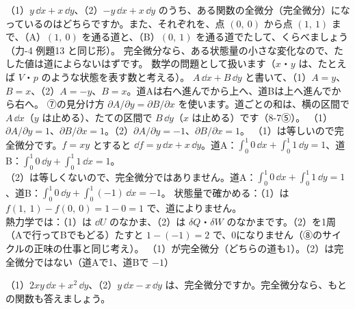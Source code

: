 \label{ph:熱-2:ex11}
\begin{phreidai}[状態量の小さな変化はどちら？]
（1）$y\,\dd x+x\,\dd y$、（2）$-y\,\dd x+x\,\dd y$ のうち、ある関数の全微分（完全微分）になっているのはどちらですか。また、それぞれを、点 $(0,\ 0)$ から点 $(1,\ 1)$ まで、（A）$(1,\ 0)$ を通る道と、（B）$(0,\ 1)$ を通る道でたして、くらべましょう（力-4 例題13 と同じ形）。
\phbamen
完全微分なら、ある状態量の小さな変化なので、たした値は道によらないはずです。
\phmushi
数学の問題として扱います（$x$・$y$ は、たとえば $V$・$p$ のような状態を表す数と考える）。
\phzu
$A\,\dd x+B\,\dd y$ と書いて、（1）$A=y$、$B=x$、（2）$A=-y$、$B=x$。道Aは右へ進んでから上へ、道Bは上へ進んでから右へ。
\phriyu
⑦の見分け方 $\partial A/\partial y=\partial B/\partial x$ を使います。道ごとの和は、横の区間で $A\,\dd x$（$y$ は止める）、たての区間で $B\,\dd y$（$x$ は止める）です（8-7⑤）。
\phtateru
（1）$\partial A/\partial y=1$、$\partial B/\partial x=1$。（2）$\partial A/\partial y=-1$、$\partial B/\partial x=1$。
\phtoku
（1）は等しいので完全微分です。$f=xy$ とすると $\dd f=y\,\dd x+x\,\dd y$。道A：$\int_0^1 0\,\dd x+\int_0^1 1\,\dd y=1$、道B：$\int_0^1 0\,\dd y+\int_0^1 1\,\dd x=1$。\\
（2）は等しくないので、完全微分ではありません。道A：$\int_0^1 0\,\dd x+\int_0^1 1\,\dd y=1$、道B：$\int_0^1 0\,\dd y+\int_0^1(-1)\,\dd x=-1$。
\phtashikame
状態量で確かめる：（1）は $f(1,\ 1)-f(0,\ 0)=1-0=1$ で、道によりません。\\
熱力学では：（1）は $\dd U$ のなかま、（2）は $\delta Q$・$\delta W$ のなかまです。（2）を1周（Aで行ってBでもどる）たすと $1-(-1)=2$ で、0になりません（⑧のサイクルの正味の仕事と同じ考え）。
\kotae （1）が完全微分（どちらの道も1）。（2）は完全微分ではない（道Aで1、道Bで $-1$）
\end{phreidai}
\begin{jibun}
（1）$2xy\,\dd x+x^2\,\dd y$、（2）$y\,\dd x-x\,\dd y$ は、完全微分ですか。完全微分なら、もとの関数も答えましょう。
\end{jibun}

